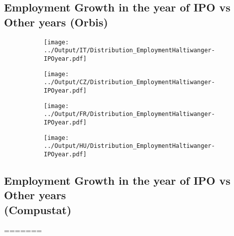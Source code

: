 \documentclass[12pt,notitlepage]{article}
\begin{document}
\subsection{Employment Growth in the year of IPO vs Other years (Orbis)}
\begin{figure}[!htpb]
\centering
\begin{subfigure}{.49\textwidth}
    \centering
 \texttt{[image: ../Output/IT/Distribution\_EmploymentHaltiwanger-IPOyear.pdf]}
\end{subfigure}%
\begin{subfigure}{.49\textwidth}
    \centering
 \texttt{[image: ../Output/CZ/Distribution\_EmploymentHaltiwanger-IPOyear.pdf]}
\end{subfigure}
\begin{subfigure}{.49\textwidth}
    \centering
 \texttt{[image: ../Output/FR/Distribution\_EmploymentHaltiwanger-IPOyear.pdf]}
\end{subfigure}%
\begin{subfigure}{.49\textwidth}
    \centering
 \texttt{[image: ../Output/HU/Distribution\_EmploymentHaltiwanger-IPOyear.pdf]}
\end{subfigure}
\end{figure}
\pagebreak

\subsection{Employment Growth in the year of IPO vs Other years \\(Compustat)}
=======
\end{document}
